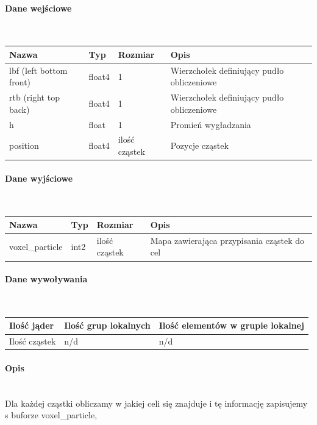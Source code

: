 \documentclass[polish, 12pt]{aghthesis}
\begin{document}
			\paragraph{Dane wejściowe} \ \\
				\begin{tabular}{| p{} | p{} | p{} | p{} |}
				\hline
					Nazwa & Typ & Rozmiar & Opis \\
				\hline
					lbf (left bottom front)& float4 & 1 & Wierzchołek definiujący pudło obliczeniowe \\ 
				\hline
					rtb (right top back) & float4 & 1 & Wierzchołek definiujący pudło obliczeniowe  \\ 
				\hline
					h & float & 1 & Promień wygładzania \\ 
				\hline
					position & float4 & ilość cząstek & Pozycje cząstek \\
				\hline
				\end{tabular}
			\paragraph{Dane wyjściowe} \ \\
				\begin{tabular}{| p{} | p{} | p{} | p{} |}
				\hline
					Nazwa & Typ & Rozmiar & Opis \\
				\hline
					voxel\_particle & int2 & ilość cząstek & Mapa zawierająca przypisania cząstek do cel \\ 
				\hline
				\end{tabular}
			\paragraph{Dane wywoływania} \ \\
				\begin{tabular}{| p{} | p{} | p{}|}
				\hline
					Ilość jąder & Ilość grup lokalnych & Ilość elementów w grupie lokalnej \\
				\hline
					Ilość cząstek & n/d & n/d \\ 
				\hline
				\end{tabular}
			\paragraph{Opis} \ \\
				\indent Dla każdej cząstki obliczamy w jakiej celi się znajduje i tę informację zapisujemy s buforze voxel\_particle,
\end{document}
